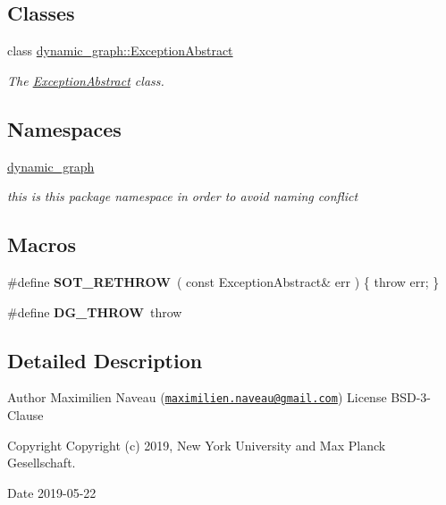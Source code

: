 \subsection*{Classes}
\begin{DoxyCompactItemize}
\item 
class \hyperlink{classdynamic__graph_1_1ExceptionAbstract}{dynamic\+\_\+graph\+::\+Exception\+Abstract}
\begin{DoxyCompactList}\small\item\em The \hyperlink{classdynamic__graph_1_1ExceptionAbstract}{Exception\+Abstract} class. \end{DoxyCompactList}\end{DoxyCompactItemize}
\subsection*{Namespaces}
\begin{DoxyCompactItemize}
\item 
 \hyperlink{namespacedynamic__graph}{dynamic\+\_\+graph}
\begin{DoxyCompactList}\small\item\em this is this package namespace in order to avoid naming conflict \end{DoxyCompactList}\end{DoxyCompactItemize}
\subsection*{Macros}
\begin{DoxyCompactItemize}
\item 
\#define {\bfseries S\+O\+T\+\_\+\+R\+E\+T\+H\+R\+OW}~( const Exception\+Abstract\& err ) \{ throw err; \}\hypertarget{exception-abstract_8hh_aba67729ca33a61234a4ca01d1e070125}{}\label{exception-abstract_8hh_aba67729ca33a61234a4ca01d1e070125}

\item 
\#define {\bfseries D\+G\+\_\+\+T\+H\+R\+OW}~throw\hypertarget{exception-abstract_8hh_af37158a4ed07567f1673457ea2656a34}{}\label{exception-abstract_8hh_af37158a4ed07567f1673457ea2656a34}

\end{DoxyCompactItemize}


\subsection{Detailed Description}
\begin{DoxyAuthor}{Author}
Maximilien Naveau (\href{mailto:maximilien.naveau@gmail.com}{\tt maximilien.\+naveau@gmail.\+com})  License B\+S\+D-\/3-\/\+Clause 
\end{DoxyAuthor}
\begin{DoxyCopyright}{Copyright}
Copyright (c) 2019, New York University and Max Planck Gesellschaft. 
\end{DoxyCopyright}
\begin{DoxyDate}{Date}
2019-\/05-\/22 
\end{DoxyDate}
